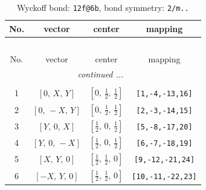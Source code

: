 \documentclass[fleqn,8pt]{jsarticle}
\begin{document}
\begin{longtable}{cccc}
\caption{Wyckoff bond: {\tt 12f@6b}, bond symmetry: {\tt 2/m..}}
 \\
 \hline \hline
No. & vector & center & mapping \\ \hline \endfirsthead

\multicolumn{3}{l}{\tablename\ \thetable{}} \\
 \hline \hline
No. & vector & center & mapping \\ \hline \endhead

 \hline \hline
\multicolumn{3}{r}{\footnotesize\it continued ...} \\ \endfoot

 \hline \hline
\multicolumn{3}{r}{} \\ \endlastfoot

1 & $\left[ 0,\, X,\, Y \right]$ & $\left[ 0,\, \frac{1}{2},\, \frac{1}{2} \right]$ & {\tt [1,-4,-13,16]} \\ \hline
2 & $\left[ 0,\, - X,\, Y \right]$ & $\left[ 0,\, \frac{1}{2},\, \frac{1}{2} \right]$ & {\tt [2,-3,-14,15]} \\ \hline
3 & $\left[ Y,\, 0,\, X \right]$ & $\left[ \frac{1}{2},\, 0,\, \frac{1}{2} \right]$ & {\tt [5,-8,-17,20]} \\ \hline
4 & $\left[ Y,\, 0,\, - X \right]$ & $\left[ \frac{1}{2},\, 0,\, \frac{1}{2} \right]$ & {\tt [6,-7,-18,19]} \\ \hline
5 & $\left[ X,\, Y,\, 0 \right]$ & $\left[ \frac{1}{2},\, \frac{1}{2},\, 0 \right]$ & {\tt [9,-12,-21,24]} \\ \hline
6 & $\left[ - X,\, Y,\, 0 \right]$ & $\left[ \frac{1}{2},\, \frac{1}{2},\, 0 \right]$ & {\tt [10,-11,-22,23]} \\
\end{longtable}
\renewcommand{\arraystretch}{1.2}
\end{document}
